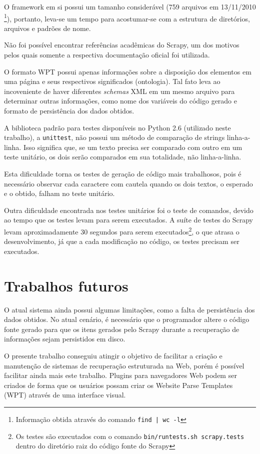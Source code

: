 O framework em si possui um tamanho considerável (759 arquivos em 13/11/2010 \footnote{Informação obtida através do comando \texttt{find | wc -l} }), portanto, leva-se um tempo para acostumar-se com a estrutura de diretórios, arquivos e padrões de nome.

Não foi possível encontrar referências acadêmicas do Scrapy, um dos motivos pelos quais somente a respectiva documentação oficial foi utilizada.

O formato WPT possui apenas informações sobre a disposição dos elementos em uma página e seus respectivos significados (ontologia). Tal fato leva ao incoveniente de haver diferentes \emph{schemas} XML em um mesmo arquivo para determinar outras informações, como nome dos variáveis do código gerado e formato de persistência dos dados obtidos.

A biblioteca padrão para testes disponíveis no Python 2.6 (utilizado neste trabalho), a \texttt{unittest}, não possui um método de comparação de strings linha-a-linha. Isso significa que, se um texto precisa ser comparado com outro em um teste unitário, os dois serão comparados em sua totalidade, não linha-a-linha. 

Esta dificuldade torna os testes de geração de código mais trabalhosos, pois é necessário observar cada caractere com cautela quando os dois textos, o esperado e o obtido, falham no teste unitário.

Outra dificuldade encontrada nos testes unitários foi o teste de comandos, devido ao tempo que os testes levam para serem executados. A suíte de testes do Scrapy levam aproximadamente 30 segundos para serem executados\footnote{Os testes são executados com o comando \texttt{bin/runtests.sh scrapy.tests} dentro do diretório raiz do código fonte do Scrapy }, o que atrasa o desenvolvimento, já que a cada modificação no código, os testes precisam ser executados.
\vfill

\pagebreak
\section{Trabalhos futuros}

O atual sistema ainda possui algumas limitações, como a falta de persistência dos dados obtidos. No atual cenário, é necessário que o programador altere o código fonte gerado para que os itens gerados pelo Scrapy durante a recuperação de informações sejam persistidos em disco.

O presente trabalho conseguiu atingir o objetivo de facilitar a criação e manutenção de sistemas de recuperação estruturada na Web, porém é possível facilitar ainda mais este trabalho. Plugins para navegadores Web podem ser criados de forma que os usuários possam criar os Website Parse Templates (WPT) através de uma interface visual.

